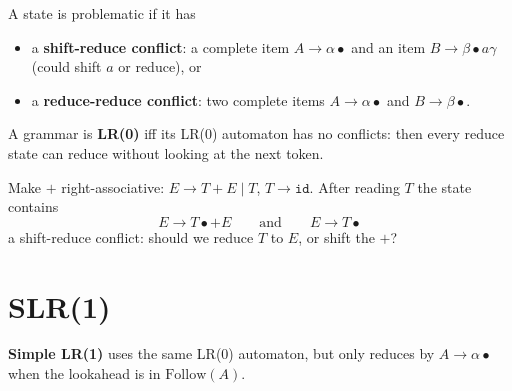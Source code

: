 A state is problematic if it has
\begin{itemize}
  \item a \textbf{shift-reduce conflict}: a complete item $A\to\alpha\bullet$ and an item
        $B\to\beta\bullet a\gamma$ (could shift $a$ or reduce), or
  \item a \textbf{reduce-reduce conflict}: two complete items $A\to\alpha\bullet$ and
        $B\to\beta\bullet$.
\end{itemize}
A grammar is \textbf{LR(0)} iff its LR(0) automaton has no conflicts: then every reduce
state can reduce without looking at the next token.

\begin{example}[LR(0) fails]
Make $+$ right-associative: $E \to T + E \mid T$, $T\to\mathtt{id}$. After reading $T$ the
state contains
\[
E \to T\bullet + E \qquad\text{and}\qquad E\to T\bullet
\]
a shift-reduce conflict: should we reduce $T$ to $E$, or shift the $+$?
\end{example}
\begin{center}
\end{center}

\section{SLR(1)}

\textbf{Simple LR(1)} uses the same LR(0) automaton, but only reduces by $A\to\alpha\bullet$
when the lookahead is in $\mathrm{Follow}(A)$.

